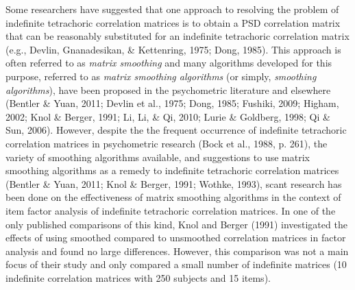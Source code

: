 \documentclass[
  english,
  man]{apa6}
\begin{document}
Some researchers have suggested that one approach to resolving the problem of indefinite tetrachoric correlation matrices is to obtain a PSD correlation matrix that can be reasonably substituted for an indefinite tetrachoric correlation matrix (e.g., Devlin, Gnanadesikan, \& Kettenring, 1975; Dong, 1985). This approach is often referred to as \emph{matrix smoothing} and many algorithms developed for this purpose, referred to as \emph{matrix smoothing algorithms} (or simply, \emph{smoothing algorithms}), have been proposed in the psychometric literature and elsewhere (Bentler \& Yuan, 2011; Devlin et al., 1975; Dong, 1985; Fushiki, 2009; Higham, 2002; Knol \& Berger, 1991; Li, Li, \& Qi, 2010; Lurie \& Goldberg, 1998; Qi \& Sun, 2006). However, despite the the frequent occurrence of indefinite tetrachoric correlation matrices in psychometric research (Bock et al., 1988, p. 261), the variety of smoothing algorithms available, and suggestions to use matrix smoothing algorithms as a remedy to indefinite tetrachoric correlation matrices (Bentler \& Yuan, 2011; Knol \& Berger, 1991; Wothke, 1993), scant research has been done on the effectiveness of matrix smoothing algorithms in the context of item factor analysis of indefinite tetrachoric correlation matrices. In one of the only published comparisons of this kind, Knol and Berger (1991) investigated the effects of using smoothed compared to unsmoothed correlation matrices in factor analysis and found no large differences. However, this comparison was not a main focus of their study and only compared a small number of indefinite matrices (10 indefinite correlation matrices with 250 subjects and 15 items).
\end{document}

